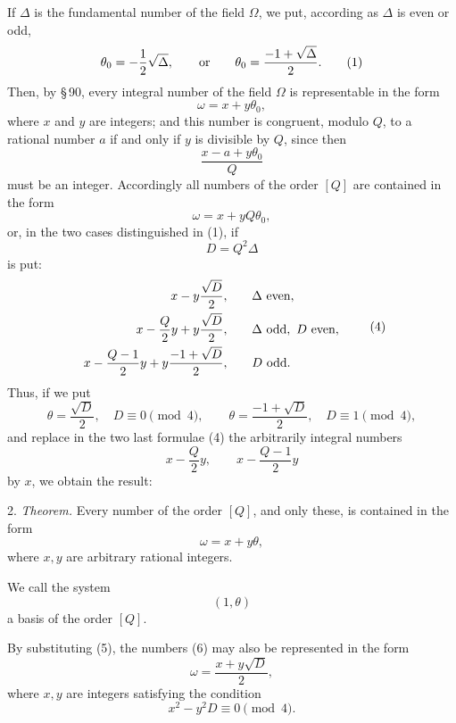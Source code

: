 \documentclass[11pt]{article}
\begin{document}
If $\Delta$ is the fundamental number of the field $\Omega$, we put, according as $\Delta$ is even or odd,
\begin{equation}
 \theta_0=-\frac{1}{2}\sqrt{\Delta},
 \qquad\hbox{or}\qquad
 \theta_0=\frac{-1+\sqrt{\Delta}}{2}.
\tag{1}
\end{equation}
Then, by \S\,90, every integral number of the field $\Omega$ is representable in the form
\begin{equation}
 \omega=x+y\theta_0,
\tag{2}
\end{equation}
where $x$ and $y$ are integers; and this number is congruent, modulo $Q$, to a rational number $a$ if and only if $y$ is divisible by $Q$, since then
\[
 \frac{x-a+y\theta_0}{Q}
\]
must be an integer. Accordingly all numbers of the order $[Q]$ are contained in the form
\[
 \omega=x+yQ\theta_0,
\]
or, in the two cases distinguished in (1), if
\begin{equation}
 D=Q^2\Delta
\tag{3}
\end{equation}
is put:
\begin{equation}
\begin{array}{rll}
 x-y\dfrac{\sqrt D}{2}, && \Delta\hbox{ even},\\[0.7em]
 x-\dfrac{Q}{2}y+y\dfrac{\sqrt D}{2}, && \Delta\hbox{ odd},\ D\hbox{ even},\\[0.7em]
 x-\dfrac{Q-1}{2}y+y\dfrac{-1+\sqrt D}{2}, && D\hbox{ odd}.
\end{array}
\tag{4}
\end{equation}
Thus, if we put
\begin{equation}
 \theta=\frac{\sqrt D}{2},\quad D\equiv0\pmod4,
 \qquad
 \theta=\frac{-1+\sqrt D}{2},\quad D\equiv1\pmod4,
\tag{5}
\end{equation}
and replace in the two last formulae (4) the arbitrarily integral numbers
\[
 x-\frac{Q}{2}y,
 \qquad x-\frac{Q-1}{2}y
\]
by $x$, we obtain the result:

2. \emph{Theorem.} Every number of the order $[Q]$, and only these, is contained in the form
\begin{equation}
 \omega=x+y\theta,
\tag{6}
\end{equation}
where $x,y$ are arbitrary rational integers.

We call the system
\begin{equation}
 (1,\theta)
\tag{7}
\end{equation}
a basis of the order $[Q]$.

By substituting (5), the numbers (6) may also be represented in the form
\begin{equation}
 \omega=\frac{x+y\sqrt D}{2},
\tag{8}
\end{equation}
where $x,y$ are integers satisfying the condition
\begin{equation}
 x^2-y^2D\equiv0\pmod4.
\tag{9}
\end{equation}
\end{document}

